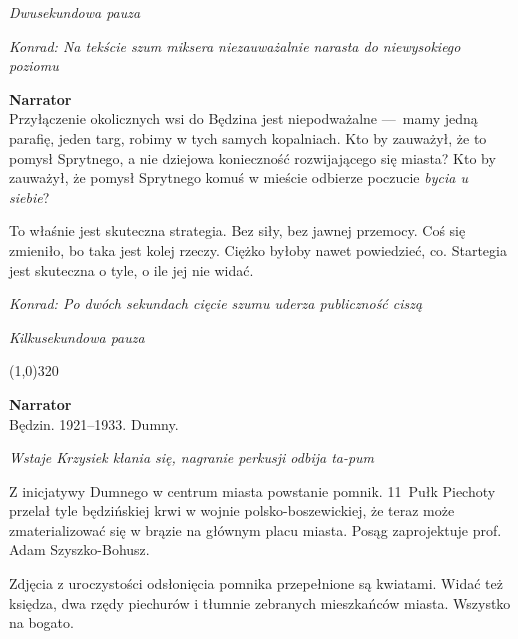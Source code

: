 \documentclass[11pt,a4paper,oneside]{article}
\begin{document}
{\color{light-gray} \emph{Dwusekundowa pauza}}

{\color{konrad} \emph{Konrad: Na tekście szum miksera niezauważalnie narasta do niewysokiego poziomu}}

\textbf{Narrator}\\
Przyłączenie okolicznych wsi do Będzina jest niepodważalne \mbox{---}~mamy
jedną parafię, jeden targ, robimy w  tych samych kopalniach. Kto by
zauważył, że to pomysł Sprytnego, a nie dziejowa konieczność
rozwijającego się miasta?  Kto by zauważył, że pomysł Sprytnego komuś
w mieście odbierze poczucie \emph{bycia u siebie}?

To właśnie jest skuteczna strategia. Bez siły, bez jawnej przemocy.
Coś się zmieniło, bo taka jest kolej rzeczy.  Ciężko byłoby nawet
powiedzieć, co. Startegia jest skuteczna o tyle, o ile jej nie widać. 

{\color{konrad} \emph{Konrad: Po dwóch sekundach cięcie szumu uderza publiczność ciszą}}

{\color{light-gray} \emph{Kilkusekundowa pauza}}


\line(1,0){320}

\textbf{Narrator}\\
Będzin. 1921--1933. Dumny. 

{\color{light-gray} \emph{Wstaje Krzysiek kłania się, nagranie
perkusji odbija ta-pum}}

Z inicjatywy Dumnego w centrum miasta powstanie pomnik. 11~Pułk Piechoty 
przelał tyle będzińskiej krwi w wojnie polsko-boszewickiej, że teraz
może zmaterializować się w brązie na głównym placu miasta. Posąg
zaprojektuje prof. Adam Szyszko-Bohusz.

Zdjęcia z uroczystości odsłonięcia pomnika przepełnione są kwiatami.
Widać też księdza, dwa rzędy piechurów i tłumnie zebranych mieszkańców
miasta. Wszystko na bogato. 

%
%
\end{document}
